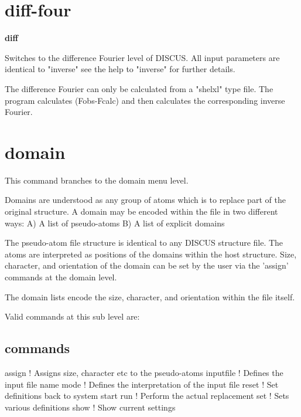\section{diff-four}
{\bf diff \par }
\par
\vspace{3pt}
Switches to the difference Fourier level of DISCUS. 
All input parameters are identical to "inverse" see the help to 
"inverse" for further details. 
\par
The difference Fourier can only be calculated from a "shelxl" type 
file. The program calculates (Fobs-Fcalc) and then calculates the 
corresponding inverse Fourier. 
\section{domain}
\par
This command branches to the domain menu level. 
\par
Domains are understood as any group of atoms which is to replace 
part of the original structure. A domain may be encoded within the 
file in two different ways: 
A) A list of pseudo-atoms 
B) A list of explicit domains 
\par
The pseudo-atom file structure is identical to any DISCUS structure 
file. The atoms are interpreted as positions of the domains within 
the host structure. Size, character, and orientation of the domain 
can be set by the user via the 'assign' commands at the domain level. 
\par
The domain lists encode the size, character, and orientation within 
the file itself. 
\par
Valid commands at this sub level are: 
\subsection*{commands}
\par
\begin{MacVerbatim}
assign     ! Assigns size, character etc to the pseudo-atoms
inputfile  ! Defines the input file name
mode       ! Defines the interpretation of the input file
reset      ! Set definitions back to system start
run        ! Perform the actual replacement
set        ! Sets various definitions
show       ! Show current settings
\end{MacVerbatim}
